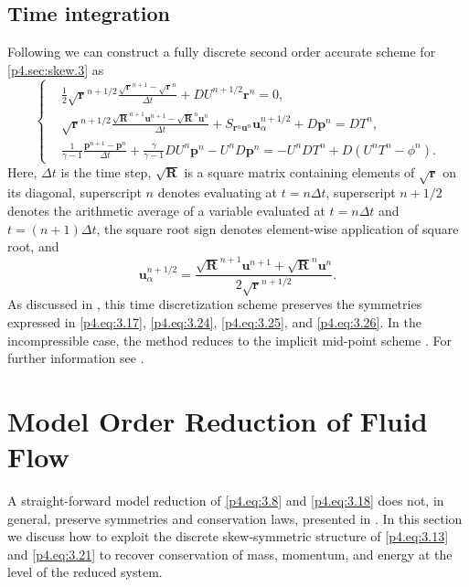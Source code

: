 \subsection{Time integration}
Following \cite{reiss2014conservative,morinishi2010skew} we can construct a fully discrete second order accurate scheme for \eqref{p4.sec:skew.3} as
\begin{equation} \label{p4.eq:3.27}
	\left\{
	\begin{aligned}
	&\frac 1 2 \sqrt{\mathbf r} ^{n+1/2} \frac{\sqrt{\mathbf r}^{n+1} - \sqrt{\mathbf r}^{n}}{\Delta t} + DU^{n+1/2} \mathbf r^{n} = 0, \\
	& \sqrt{\mathbf r} ^{n+1/2}  \frac{\sqrt{ \mathbf R}^{n+1} \mathbf u^{n+1} - \sqrt{\mathbf R}^{n}\mathbf u^n}{\Delta t} + S_{\mathbf r^{n} \mathbf u^n} \mathbf u^{n+1/2}_\alpha + D \mathbf p^{n} = DT^{n}, \\
	& \frac 1 {\gamma -1} \frac{\mathbf p^{n+1} - \mathbf p^n}{\Delta t} + \frac{\gamma}{\gamma -1} D U^{n} \mathbf p^n - U^{n} D \mathbf p^n = - U^{n}D T^{n} + D (U^nT^n - \phi^n).
	\end{aligned}
	\right.
\end{equation}
Here, $\Delta t$ is the time step, $\sqrt{\mathbf R}$ is a square matrix containing elements of $\sqrt{\mathbf r}$ on its diagonal, superscript $n$ denotes evaluating at $t = n\Delta t$, superscript $n+1/2$ denotes the arithmetic average of a variable evaluated at $t=n\Delta t$ and $t=(n+1)\Delta t$, the square root sign denotes element-wise application of square root, and 
\begin{equation}
	\mathbf u_{\alpha}^{n+1/2} = \frac{\sqrt{\mathbf R}^{n+1} \mathbf u^{n+1} + \sqrt{\mathbf R}^{n} \mathbf u^{n}}{2\sqrt{\mathbf r}^{n+1/2} }.
\end{equation}
As discussed in \cite{reiss2014conservative}, this time discretization scheme preserves the symmetries expressed in \eqref{p4.eq:3.17}, \eqref{p4.eq:3.24}, \eqref{p4.eq:3.25}, and \eqref{p4.eq:3.26}. In the incompressible case, the method reduces to the implicit mid-point scheme \cite{hairer2006geometric}. For further information see \cite{reiss2014conservative,morinishi2010skew}.

\section{Model Order Reduction of Fluid Flow} \label{p4.sec:mor_skew}
A straight-forward model reduction of \eqref{p4.eq:3.8} and \eqref{p4.eq:3.18} does not, in general, preserve symmetries and conservation laws, presented in . In this section we discuss how to exploit the discrete skew-symmetric structure of \eqref{p4.eq:3.13} and \eqref{p4.eq:3.21} to recover conservation of mass, momentum, and energy at the level of the reduced system.

